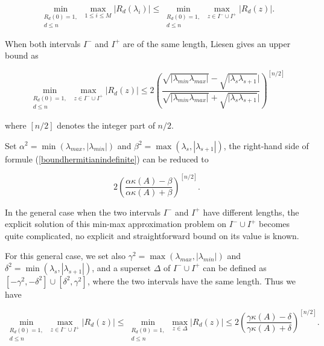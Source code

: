 {	\begin{equation}
	\min_{\substack{R_d(0)=1, \\ d \leq n}} \max_{1 \leq i \leq M}|R_d(\lambda_i)| \leq     \min_{\substack{R_d(0)=1, \\ d \leq n}} \max_{z \in I^{-} \cup I^{+}}|R_d(z)|.
	\end{equation}
	
	When both intervals $I^{-}$ and $I^{+}$ are of the same length, Liesen \cite{liesen2004convergence} gives an upper bound as
	
	\begin{equation}
	\label{boundhermitianindefinite}
	\min_{\substack{R_d(0)=1, \\ d \leq n}} \max_{z \in I^{-} \cup I^{+}}|R_d(z)| \leq 2\left (\dfrac{\sqrt{|\lambda_{min}\lambda_{max}|}-\sqrt{|\lambda_{s}\lambda_{s+1}}|}{\sqrt{|\lambda_{min}\lambda_{max}|}+\sqrt{|\lambda_{s}\lambda_{s+1}}|}\right)^{[n/2]}
	\end{equation}
	
	where $[n/2]$ denotes the integer part of $n/2$. 
	
	Set $\alpha^2=\min(\lambda_{max}, |\lambda_{min}|)$ and  $\beta^2=\max(\lambda_{s}, |\lambda_{s+1}|)$, the right-hand side of formule (\ref{boundhermitianindefinite}) can be reduced to
	
	\begin{equation}
	2\left (\dfrac{\alpha\kappa(A)-\beta}{\alpha\kappa(A)+\beta}\right)^{[n/2]}. 
	\end{equation}
	
	In the general case when the two intervals $I^{-}$ and $I^{+}$ have different lengths, the explicit solution of this min-max approximation problem on $I^{-} \cup I^{+}$ becomes quite complicated, no explicit and straightforward bound on its value is known.
	
	For this general case,  we set also $\gamma^2=\max(\lambda_{max}, |\lambda_{min}|)$ and  $\delta^2=\min(\lambda_{s}, |\lambda_{s+1}|)$, and a superset $\Delta$ of $I^{-} \cup I^{+}$ can be defined as $[-\gamma^2, -\delta^2] \cup [\delta^2, \gamma^2]$, where the two intervals have the same length. Thus we have
	
	\begin{equation}
	\label{boundhermitianindefinitegeneral}
	\min_{\substack{R_d(0)=1, \\ d \leq n}} \max_{z \in I^{-} \cup I^{+}}|R_d(z)| \leq \min_{\substack{R_d(0)=1, \\ d \leq n}} \max_{z \in \Delta}|R_d(z)| \leq 2\left (\dfrac{\gamma\kappa(A)-\delta}{\gamma\kappa(A)+\delta}\right)^{[n/2]}.
	\end{equation}
	
}
